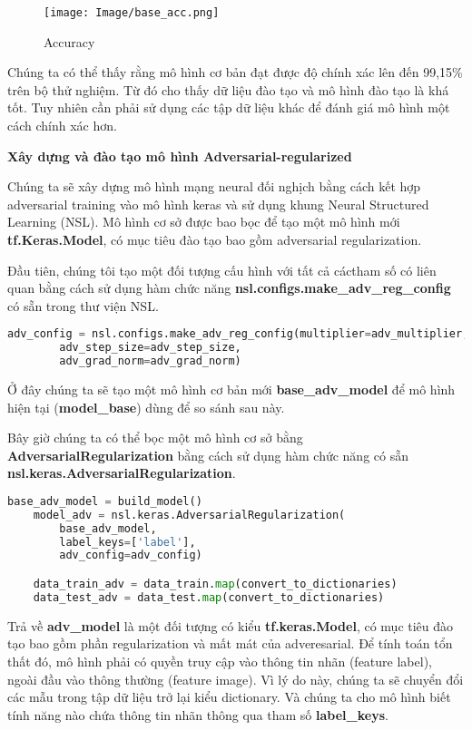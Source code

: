\begin{figure}[ht]
\centering
\texttt{[image: Image/base\_acc.png]}
\caption{Accuracy}
\label{fig2.2:Độ chính xác của mô hình cơ bản}
\end{figure}

Chúng ta có thể thấy rằng mô hình cơ bản đạt được độ chính xác lên đến 99,15\% trên bộ thử nghiệm. Từ đó cho thấy dữ liệu đào tạo và 
mô hình đào tạo là khá tốt. Tuy nhiên cần phải sử dụng các tập dữ liệu khác để đánh giá mô hình một cách chính xác hơn.

\textbf{Xây dựng và đào tạo mô hình Adversarial-regularized }

Chúng ta sẽ xây dựng mô hình mạng neural đối nghịch bằng cách kết hợp adversarial training vào mô hình keras và sử dụng khung Neural Structured Learning (NSL).
Mô hình cơ sở được bao bọc để tạo một mô hình mới \textbf{tf.Keras.Model}, có mục tiêu đào tạo bao gồm adversarial regularization.

Đầu tiên, chúng tôi tạo một đối tượng cấu hình với tất cả cáctham số có liên quan bằng cách sử dụng hàm chức năng \textbf{nsl.configs.make\_adv\_reg\_config} có sẵn trong thư viện NSL.

\begin{lstlisting}[language=Python]
    adv_config = nsl.configs.make_adv_reg_config(multiplier=adv_multiplier, 
        adv_step_size=adv_step_size, 
        adv_grad_norm=adv_grad_norm)
\end{lstlisting}

Ở đây chúng ta sẽ tạo một mô hình cơ bản mới \textbf{base\_adv\_model} để mô hình hiện tại (\textbf{model\_base}) dùng để so sánh sau này.

Bây giờ chúng ta có thể bọc một mô hình cơ sở bằng \textbf{AdversarialRegularization} bằng cách sử dụng hàm chức năng
có sẵn \textbf{nsl.keras.AdversarialRegularization}.

\begin{lstlisting}[language=Python]
    base_adv_model = build_model()
    model_adv = nsl.keras.AdversarialRegularization(
        base_adv_model,
        label_keys=['label'],
        adv_config=adv_config)

    data_train_adv = data_train.map(convert_to_dictionaries)
    data_test_adv = data_test.map(convert_to_dictionaries)
\end{lstlisting}

Trả về \textbf{adv\_model} là một đối tượng có kiểu \textbf{tf.keras.Model}, có mục tiêu đào tạo bao gồm phần regularization và mất mát của adveresarial. Để tính toán tổn thất đó, mô hình phải có quyền truy cập 
vào thông tin nhãn (feature label), ngoài đầu vào thông thường (feature image). Vì lý do này, chúng ta sẽ chuyển đổi các mẫu trong tập dữ liệu trở lại kiểu dictionary. Và chúng ta cho mô 
hình biết tính năng nào chứa thông tin nhãn thông qua tham số \textbf{label\_keys}.

